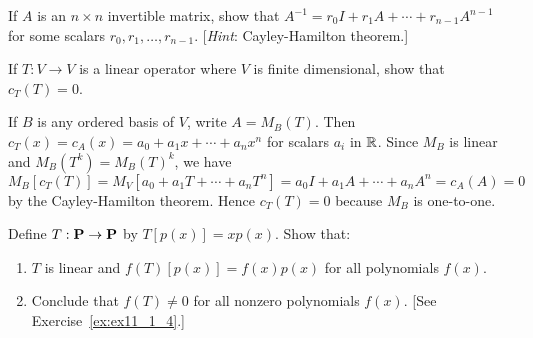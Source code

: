 \begin{multicols}{2}
\begin{ex}
\begin{enumerate}
\end{enumerate}
\end{ex}

\begin{ex}
If $A$ is an $n \times n$ invertible matrix, show that $A^{-1} = r_{0}I + r_{1}A + \cdots + r_{n-1}A^{n-1}$ for some scalars $r_{0}, r_{1}, \dots, r_{n-1}$. [\textit{Hint}: Cayley-Hamilton theorem.]
\end{ex}

\begin{ex}\label{ex:ex11_1_4}
If $T : V \to V$ is a linear operator where $V$ is finite dimensional, show that $c_{T}(T) = 0$. 

\begin{sol}
If $B$ is any ordered basis of $V$, write $A = M_{B}(T)$. Then $c_{T}(x) = c_{A}(x) = a_{0} + a_{1}x + \cdots + a_{n}x^{n}$ for scalars $a_{i}$ in $\mathbb{R}$. Since $M_{B}$ is linear and $M_{B}(T^{k}) = M_{B}(T)^{k}$, we have $M_{B}[c_{T}(T)] = M_{V}[a_{0} + a_{1}T + \cdots + a_{n}T^{n}] = a_{0}I + a_{1}A + \cdots + a_{n}A^{n} = c_{A}(A) = 0$ by the Cayley-Hamilton theorem. Hence $c_{T}(T) = 0$ because $M_{B}$ is one-to-one.
\end{sol}
\end{ex}

\columnbreak

\begin{ex}
Define $T : \textbf{P} \to \textbf{P}$ by $T[p(x)] = xp(x)$. Show that:


\begin{enumerate}[label={\alph*.}]
\item $T$ is linear and $f(T)[p(x)] = f(x)p(x)$ for all polynomials $f(x)$.

\item Conclude that $f(T) \neq 0$ for all nonzero polynomials $f(x)$. [See Exercise~\ref{ex:ex11_1_4}.]

\end{enumerate}
\end{ex}
\end{multicols}
